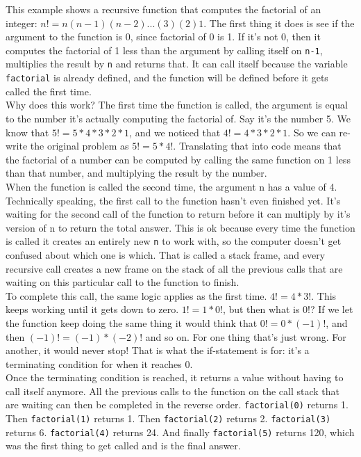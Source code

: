 This example shows a recursive function that computes the factorial of an integer: \(n! = n(n-1)(n-2)...(3)(2)1\). The first thing it does is see if the argument to the function is  0, since factorial of 0 is 1. If it's not 0, then it computes the factorial of 1 less than the argument by calling itself on \texttt{n-1}, multiplies the result by \texttt{n} and returns that. It can call itself because the variable \texttt{factorial} is already defined, and the function will be defined before it gets called the first time.\\

Why does this work? The first time the function is called, the argument is equal to the number it's actually computing the factorial of. Say it's the number 5. We know that \(5! = 5*4*3*2*1\), and we noticed that \(4! = 4*3*2*1\). So we can re-write the original problem as \(5! = 5*4!\). Translating that into code means that the factorial of a number can be computed by calling the same function on 1 less than that number, and multiplying the result by the number.\\

When the function is called the second time, the argument n has a value of 4. Technically speaking, the first call to the function hasn't even finished yet. It's waiting for the second call of the function to return before it can multiply by it's version of n to return the total answer. This is ok because every time the function is called it creates an entirely new \texttt{n} to work with, so the computer doesn't get confused about which one is which. That is called a stack frame, and every recursive call creates a new frame on the stack of all the previous calls that are waiting on this particular call to the function to finish.\\

To complete this call, the same logic applies as the first time. \(4! = 4 * 3!\). This keeps working until it gets down to zero. \(1! = 1 * 0!\), but then what is \(0!\)? If we let the function keep doing the same thing it would think that \(0! = 0 * (-1)!\), and then \((-1)! = (-1)*(-2)!\)  and so on. For one thing that's just wrong. For another, it would never stop! That is what the if-statement is for: it's a terminating condition for when it reaches 0.\\

Once the terminating condition is reached, it returns a value without having to call itself anymore. All the previous calls to the function on the call stack that are waiting can then be completed in the reverse order. \texttt{factorial(0)} returns 1. Then \texttt{factorial(1)} returns 1. Then \texttt{factorial(2)} returns 2. \texttt{factorial(3)} returns 6. \texttt{factorial(4)} returns 24. And finally \texttt{factorial(5)} returns 120, which was the first thing to get called and is the final answer.\\

